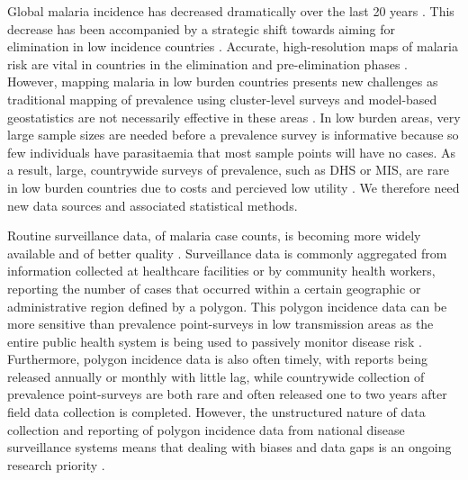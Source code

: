 \documentclass[10pt,letterpaper]{article}
\begin{document}

Global malaria incidence has decreased dramatically over the last 20 years \cite{abajobir2017global, bhatt2015effect}.
This decrease has been accompanied by a strategic shift towards aiming for elimination in low incidence countries \cite{world2016world, newby2016path}.
Accurate, high-resolution maps of malaria risk are vital in countries in the elimination and pre-elimination phases \cite{sturrock2016mapping, cohen2017mapping}.
However, mapping malaria in low burden countries presents new challenges as traditional mapping of prevalence \cite{gething2011new, bhatt2017improved, gething2012long, bhatt2015effect} using cluster-level surveys and model-based geostatistics are not necessarily effective in these areas \cite{sturrock2016mapping, sturrock2014fine}.
In low burden areas, very large sample sizes are needed before a prevalence survey is informative because so few individuals have parasitaemia that most sample points will have no cases.
As a result, large, countrywide surveys of prevalence, such as DHS or MIS, are rare in low burden countries due to costs and percieved low utility \cite{dhs}.
We therefore need new data sources and associated statistical methods.



Routine surveillance data, of malaria case counts, is becoming more widely available and of better quality \cite{sturrock2016mapping, ohrt2015information, cibulskis2011worldwide}.
Surveillance data is commonly aggregated from information collected at healthcare facilities or by community health workers, reporting the number of cases that occurred within a certain geographic or administrative region defined by a polygon.
This polygon incidence data can be more sensitive than prevalence point-surveys in low transmission areas as the entire public health system is being used to passively monitor disease risk \cite{cibulskis2011worldwide}.
Furthermore, polygon incidence data is also often timely, with reports being released annually or monthly with little lag, while countrywide collection of prevalence point-surveys are both rare and often released one to two years after field data collection is completed.
However, the unstructured nature of data collection and reporting of polygon incidence data from national disease surveillance systems means that dealing with biases and data gaps is an ongoing research priority \cite{battle2016treatment, cibulskis2011worldwide}.
\end{document}
